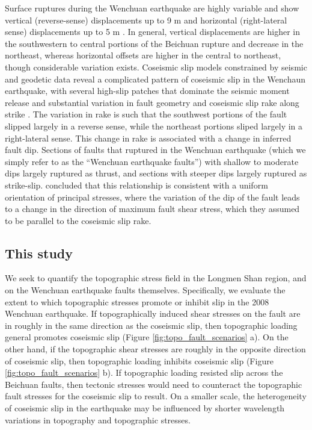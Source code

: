 \documentclass[draft,jgrga]{AGUTeX}
\begin{document}
\begin{article}
Surface ruptures during the Wenchuan earthquake are highly variable and show
vertical (reverse-sense) displacements up to 9 m and horizontal (right-lateral
sense) displacements up to 5 m \citep{lin2009, liu2009, xu2009}. In general,
vertical displacements are higher in the southwestern to central portions of
the Beichuan rupture and decrease in the northeast, whereas horizontal offsets
are higher in the central to northeast, though considerable variation exists.
Coseismic slip models constrained by seismic and geodetic data reveal a
complicated pattern of coseismic slip in the Wenchaun earthquake, with several
high-slip patches that dominate the seismic moment release and substantial
variation in fault geometry and coseismic slip rake along strike 
\citep[e.g.,][]{nakamura2010,
shen2009, tong2010, feng2010, zhang2011, qi2011, fielding2013}.  The variation
in rake is such that the southwest portions of the fault slipped largely in a
reverse sense, while the northeast portions sliped largely in a right-lateral
sense. This change in rake is associated with a change in inferred fault dip.
Sections of faults that ruptured in the Wenchuan earthquake (which we simply
refer to as the ``Wenchuan earthquake faults'') with shallow to moderate dips
largely ruptured as thrust, and sections with steeper dips largely ruptured as
strike-slip.  \citet{medinaluna2013} concluded that this relationship is
consistent with a uniform orientation of principal stresses, where the
variation of the dip of the fault leads to a change in the direction of maximum
fault shear stress, which they assumed to be parallel to the coseismic slip
rake.

\subsection{This study}\label{this-study}

We seek to quantify the topographic stress field in the Longmen Shan region,
and on the Wenchuan earthquake faults themselves. Specifically, we evaluate the
extent to which topographic stresses promote or inhibit slip in the 2008
Wenchuan earthquake. If topographically induced shear stresses on the fault are
in roughly in the same direction as the coseismic slip, then topographic
loading general promotes coseismic slip (Figure \ref{fig:topo_fault_scenarios}
a). On the other hand, if the topographic shear stresses are roughly in the
opposite direction of coseismic slip, then topographic loading inhibits
coseismic slip (Figure \ref{fig:topo_fault_scenarios} b). If topographic
loading resisted slip across the Beichuan faults, then tectonic stresses would
need to counteract the topographic fault stresses for the coseismic slip to
result. On a smaller scale, the heterogeneity of coseismic slip in the
earthquake may be influenced by shorter wavelength variations in topography and
topographic stresses.


\end{article}
\end{document}
